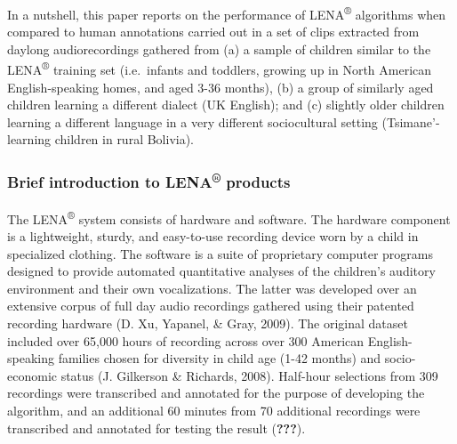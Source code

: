 \documentclass[english,floatsintext,man]{apa6}
\begin{document}
In a nutshell, this paper reports on the performance of
LENA\textsuperscript{®} algorithms when compared to human annotations
carried out in a set of clips extracted from daylong audiorecordings
gathered from (a) a sample of children similar to the
LENA\textsuperscript{®} training set (i.e.~infants and toddlers, growing
up in North American English-speaking homes, and aged 3-36 months), (b)
a group of similarly aged children learning a different dialect (UK
English); and (c) slightly older children learning a different language
in a very different sociocultural setting (Tsimane'-learning children in
rural Bolivia).

\subsubsection{\texorpdfstring{Brief introduction to
LENA\textsuperscript{®}
products}{Brief introduction to LENA® products}}\label{brief-introduction-to-lena-products}

The LENA\textsuperscript{®} system consists of hardware and software.
The hardware component is a lightweight, sturdy, and easy-to-use
recording device worn by a child in specialized clothing. The software
is a suite of proprietary computer programs designed to provide
automated quantitative analyses of the children's auditory environment
and their own vocalizations. The latter was developed over an extensive
corpus of full day audio recordings gathered using their patented
recording hardware (D. Xu, Yapanel, \& Gray, 2009). The original dataset
included over 65,000 hours of recording across over 300 American
English-speaking families chosen for diversity in child age (1-42
months) and socio-economic status (J. Gilkerson \& Richards, 2008).
Half-hour selections from 309 recordings were transcribed and annotated
for the purpose of developing the algorithm, and an additional 60
minutes from 70 additional recordings were transcribed and annotated for
testing the result ({\textbf{???}}).
\end{document}
